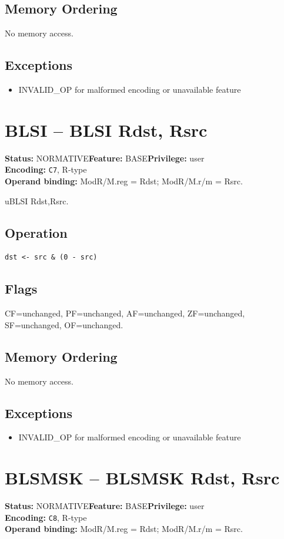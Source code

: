 \documentclass[10pt]{article}
\begin{document}
\subsection*{Memory Ordering}
No memory access.
\subsection*{Exceptions}
\begin{itemize}
\item INVALID\_OP for malformed encoding or unavailable feature
\end{itemize}
\clearpage

\section{BLSI -- BLSI Rdst, Rsrc}
\textbf{Status:} NORMATIVE\quad \textbf{Feature:} BASE\quad \textbf{Privilege:} user\\
\textbf{Encoding:} \texttt{C7}, R-type\\
\textbf{Operand binding:} ModR/M.reg = Rdst; ModR/M.r/m = Rsrc.

uBLSI Rdst,Rsrc.

\subsection*{Operation}
\begin{lstlisting}
dst <- src & (0 - src)
\end{lstlisting}
\subsection*{Flags}
CF=unchanged, PF=unchanged, AF=unchanged, ZF=unchanged, SF=unchanged, OF=unchanged.
\subsection*{Memory Ordering}
No memory access.
\subsection*{Exceptions}
\begin{itemize}
\item INVALID\_OP for malformed encoding or unavailable feature
\end{itemize}
\clearpage

\section{BLSMSK -- BLSMSK Rdst, Rsrc}
\textbf{Status:} NORMATIVE\quad \textbf{Feature:} BASE\quad \textbf{Privilege:} user\\
\textbf{Encoding:} \texttt{C8}, R-type\\
\textbf{Operand binding:} ModR/M.reg = Rdst; ModR/M.r/m = Rsrc.
\end{document}
